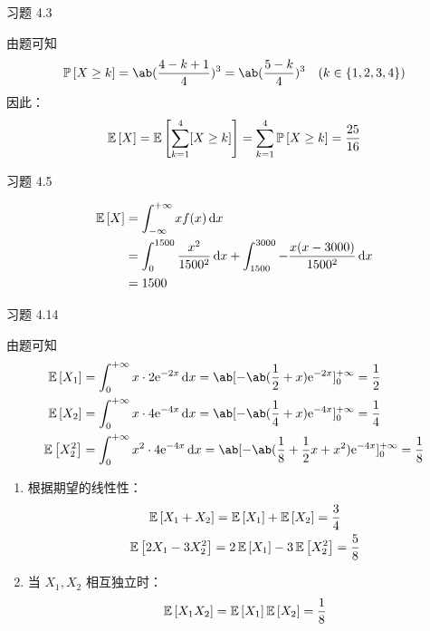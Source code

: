 \begin{problem}
    习题 4.3
    \begin{solution}
        由题可知
        $$
        \prob{X \ge k} = \ab(\frac{4 - k + 1}{4})^3 = \ab(\frac{5 - k}{4})^3 \quad (k \in \{1, 2, 3, 4\})
        $$
        因此：
        $$
        \operatorname{\mathbb{E}}\left[X\right] = \operatorname{\mathbb{E}}\left[\sum_{k = 1}^{4} [X \ge k]\right] = \sum_{k = 1}^{4} \operatorname{\mathbb{P}}\left[X \ge k\right] = \frac{25}{16}
        $$
    \end{solution}
\end{problem}

\begin{problem}
    习题 4.5
    \begin{solution}
        $$
        \begin{aligned}
            \operatorname{\mathbb{E}}\left[X\right] & = \int_{- \infty}^{+ \infty} x f(x) \dd{x} \\
            & = \int_{0}^{1500} \frac{x^2}{1500^2} \dd{x} + \int_{1500}^{3000} - \frac{x (x - 3000)}{1500^2} \dd{x} \\
            & = 1500
        \end{aligned}
        $$
    \end{solution}
\end{problem}

\begin{problem}
    习题 4.14
    \begin{solution}
        由题可知
        $$
        \begin{aligned}
            \expect{X_1} & = \int_{0}^{+ \infty} x \cdot 2 \E^{-2x} \dd{x} = \ab[-\ab(\frac{1}{2} + x) \E^{-2x}]_{0}^{+ \infty} = \frac{1}{2} \\
            \expect{X_2} & = \int_{0}^{+ \infty} x \cdot 4 \E^{-4x} \dd{x} = \ab[-\ab(\frac{1}{4} + x) \E^{-4x}]_{0}^{+ \infty} = \frac{1}{4} \\
            \expect{X_2^2} & = \int_{0}^{+ \infty} x^2 \cdot 4 \E^{-4x} \dd{x} = \ab[-\ab(\frac{1}{8} + \frac{1}{2} x + x^2) \E^{-4x}]_{0}^{+ \infty} = \frac{1}{8}
        \end{aligned}
        $$
        \begin{enumerate}
            \item[\textbf{1)}] 根据期望的线性性：
            $$
            \begin{gathered}
                \operatorname{\mathbb{E}}\left[X_1 + X_2\right] = \operatorname{\mathbb{E}}\left[X_1\right] + \operatorname{\mathbb{E}}\left[X_2\right] = \frac{3}{4} \\
                \operatorname{\mathbb{E}}\left[2 X_1 - 3 X_2^2\right] = 2 \operatorname{\mathbb{E}}\left[X_1\right] - 3 \operatorname{\mathbb{E}}\left[X_2^2\right] = \frac{5}{8}
            \end{gathered}
            $$

            \item[\textbf{2)}] 当 $X_1, X_2$ 相互独立时：
            $$
            \operatorname{\mathbb{E}}\left[X_1 X_2\right] = \operatorname{\mathbb{E}}\left[X_1\right] \operatorname{\mathbb{E}}\left[X_2\right] = \frac{1}{8}
            $$
        \end{enumerate}
    \end{solution}
\end{problem}

